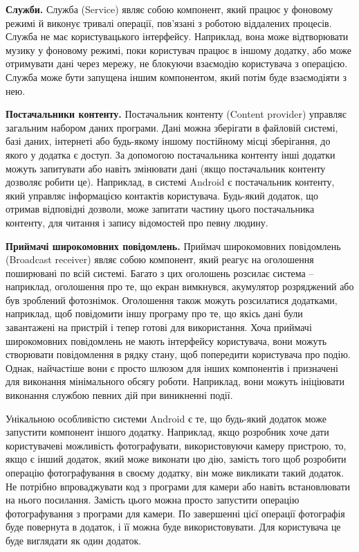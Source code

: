 \documentclass[../main.tex]{subfiles}
\begin{document}
\textbf{Служби.} Служба (Service) являє собою компонент, який працює у фоновому режимі й виконує тривалі операції, пов'язані з роботою віддалених процесів. Служба не має користувацького інтерфейсу. Наприклад, вона може відтворювати музику у фоновому режимі, поки користувач працює в іншому додатку, або може отримувати дані через мережу, не блокуючи взаємодію користувача з операцією. Служба може бути запущена іншим компонентом, який потім буде взаємодіяти з нею.

\textbf{Постачальники контенту.} Постачальник контенту (Content provider) управляє загальним набором даних програми. Дані можна зберігати в файловій системі, базі даних, інтернеті або будь-якому іншому постійному місці зберігання, до якого у додатка є доступ. За допомогою постачальника контенту інші додатки можуть запитувати або навіть змінювати дані (якщо постачальник контенту дозволяє робити це). Наприклад, в системі Android є постачальник контенту, який управляє інформацією контактів користувача. Будь-який додаток, що отримав відповідні дозволи, може запитати частину цього постачальника контенту, для читання і запису відомостей про певну людину.

\textbf{Приймачі широкомовних повідомлень.} Приймач широкомовних повідомлень (Broadcast receiver) являє собою компонент, який реагує на оголошення поширювані по всій системі. Багато з цих оголошень розсилає система -- наприклад, оголошення про те, що екран вимкнувся, акумулятор розряджений або був зроблений фотознімок. Оголошення також можуть розсилатися додатками, наприклад, щоб повідомити іншу програму про те, що якісь дані були завантажені на пристрій і тепер готові для використання. Хоча приймачі широкомовних повідомлень не мають інтерфейсу користувача, вони можуть створювати повідомлення в рядку стану, щоб попередити користувача про подію. Однак, найчастіше вони є просто шлюзом для інших компонентів і призначені для виконання мінімального обсягу роботи. Наприклад, вони можуть ініціювати виконання службою певних дій при виникненні події.

Унікальною особливістю системи Android є те, що будь-який додаток може запустити компонент іншого додатку. Наприклад, якщо розробник хоче дати користувачеві можливість фотографувати, використовуючи камеру пристрою, то, якщо є інший додаток, який може виконати цю дію, замість того щоб розробити операцію фотографування в своєму додатку, він може викликати такий додаток. Не потрібно впроваджувати код з програми для камери або навіть встановлювати на нього посилання. Замість цього можна просто запустити операцію фотографування з програми для камери. По завершенні цієї операції фотографія буде повернута в додаток, і її можна буде використовувати. Для користувача це буде виглядати як один додаток.
\end{document}
